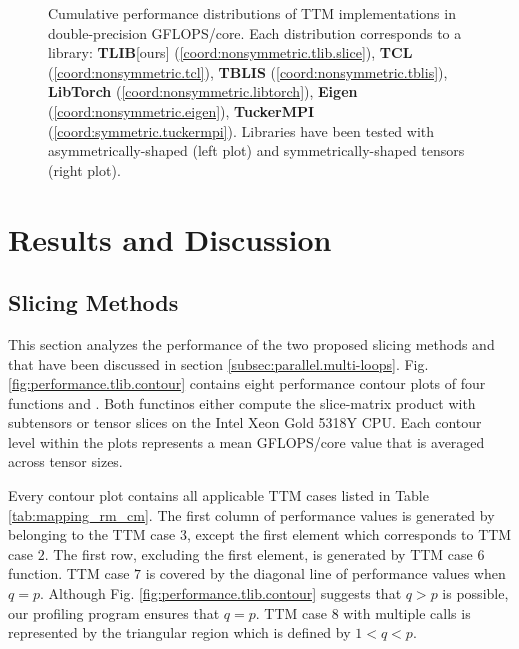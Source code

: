 \begin{figure*}[t]

 
\caption{ %
\footnotesize%
Cumulative performance distributions of TTM implementations in double-precision GFLOPS/core.
Each distribution corresponds to a library:
\textbf{TLIB}[ours] (\ref{coord:nonsymmetric.tlib.slice}), %
\textbf{TCL} (\ref{coord:nonsymmetric.tcl}), %
\textbf{TBLIS} (\ref{coord:nonsymmetric.tblis}), %
\textbf{LibTorch} (\ref{coord:nonsymmetric.libtorch}), %
\textbf{Eigen} (\ref{coord:nonsymmetric.eigen}),
\textbf{TuckerMPI} (\ref{coord:symmetric.tuckermpi}).
Libraries have been tested with asymmetrically-shaped (left plot) and symmetrically-shaped tensors (right plot).
}
\label{fig:performance.comparison}
\end{figure*}



\section{Results and Discussion}
\label{sec:results}


\subsection{Slicing Methods}
\label{subsec:results.slicing-methods}
This section analyzes the performance of the two proposed slicing methods  and  that have been discussed in section \ref{subsec:parallel.multi-loops}.
Fig. \ref{fig:performance.tlib.contour} contains eight performance contour plots of four  functions  and .
Both functinos either compute the slice-matrix product with subtensors  or tensor slices  on the Intel Xeon Gold 5318Y CPU.
Each contour level within the plots represents a mean GFLOPS/core value that is averaged across tensor sizes.

Every contour plot contains all applicable TTM cases listed in Table \ref{tab:mapping_rm_cm}.
The first column of performance values is generated by  belonging to the TTM case $3$, except the first element which corresponds to TTM case $2$.
The first row, excluding the first element, is generated by TTM case $6$ function.
TTM case $7$ is covered by the diagonal line of performance values when $q = p$.  
Although Fig. \ref{fig:performance.tlib.contour} suggests that $q>p$ is possible, our profiling program ensures that $q=p$.
TTM case $8$ with multiple  calls is represented by the triangular region which is defined by $1<q<p$.



